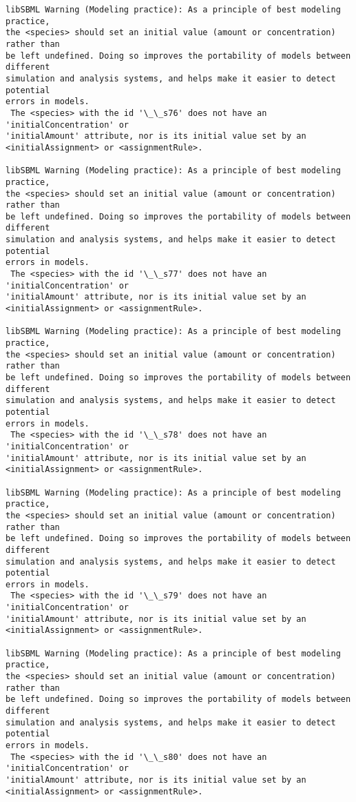 \documentclass[11pt]{article}
\begin{document}
\begin{Verbatim}[commandchars=\\\{\}]
libSBML Warning (Modeling practice): As a principle of best modeling practice,
the <species> should set an initial value (amount or concentration) rather than
be left undefined. Doing so improves the portability of models between different
simulation and analysis systems, and helps make it easier to detect potential
errors in models.
 The <species> with the id '\_\_s76' does not have an 'initialConcentration' or
'initialAmount' attribute, nor is its initial value set by an
<initialAssignment> or <assignmentRule>.

libSBML Warning (Modeling practice): As a principle of best modeling practice,
the <species> should set an initial value (amount or concentration) rather than
be left undefined. Doing so improves the portability of models between different
simulation and analysis systems, and helps make it easier to detect potential
errors in models.
 The <species> with the id '\_\_s77' does not have an 'initialConcentration' or
'initialAmount' attribute, nor is its initial value set by an
<initialAssignment> or <assignmentRule>.

libSBML Warning (Modeling practice): As a principle of best modeling practice,
the <species> should set an initial value (amount or concentration) rather than
be left undefined. Doing so improves the portability of models between different
simulation and analysis systems, and helps make it easier to detect potential
errors in models.
 The <species> with the id '\_\_s78' does not have an 'initialConcentration' or
'initialAmount' attribute, nor is its initial value set by an
<initialAssignment> or <assignmentRule>.

libSBML Warning (Modeling practice): As a principle of best modeling practice,
the <species> should set an initial value (amount or concentration) rather than
be left undefined. Doing so improves the portability of models between different
simulation and analysis systems, and helps make it easier to detect potential
errors in models.
 The <species> with the id '\_\_s79' does not have an 'initialConcentration' or
'initialAmount' attribute, nor is its initial value set by an
<initialAssignment> or <assignmentRule>.

libSBML Warning (Modeling practice): As a principle of best modeling practice,
the <species> should set an initial value (amount or concentration) rather than
be left undefined. Doing so improves the portability of models between different
simulation and analysis systems, and helps make it easier to detect potential
errors in models.
 The <species> with the id '\_\_s80' does not have an 'initialConcentration' or
'initialAmount' attribute, nor is its initial value set by an
<initialAssignment> or <assignmentRule>.


\end{Verbatim}
\end{document}
